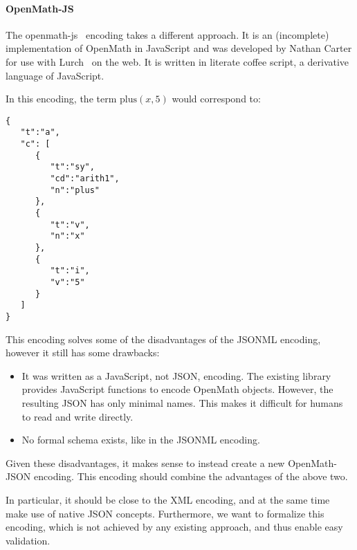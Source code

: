 \paragraph{OpenMath-JS}
The openmath-js~\cite{openmathjs:webpage} encoding takes a different approach. 
It is an (incomplete) implementation of OpenMath in JavaScript and was developed by Nathan Carter for use with Lurch~\cite{CarterMonks:OM:CICM-WS-WiP2013} on the web. 
It is written in literate coffee script, a derivative language of JavaScript. 

In this encoding, the term $\mathrm{plus}(x, 5)$ would correspond to: 
\begin{lstlisting}
{  
   "t":"a",
   "c": [  
      {  
         "t":"sy",
         "cd":"arith1",
         "n":"plus"
      },
      {  
         "t":"v",
         "n":"x"
      },
      {  
         "t":"i",
         "v":"5"
      }
   ]
}
\end{lstlisting}

This encoding solves some of the disadvantages of the JSONML encoding, however it still has some drawbacks:

\begin{itemize}
\item It was written as a JavaScript, not JSON, encoding.  The existing library provides
  JavaScript functions to encode OpenMath objects.  However, the resulting JSON has only
  minimal names.  This makes it difficult for humans to read and write directly.
\item No formal schema exists, like in the JSONML encoding.
\end{itemize}


Given these disadvantages, it makes sense to instead create a new OpenMath-JSON encoding. 
This encoding should combine the advantages of the above two. 

In particular, it should be close to the XML encoding, and at the same time make use of native JSON concepts. 
Furthermore, we want to formalize this encoding, which is not achieved by any existing approach, and thus enable easy validation. 


